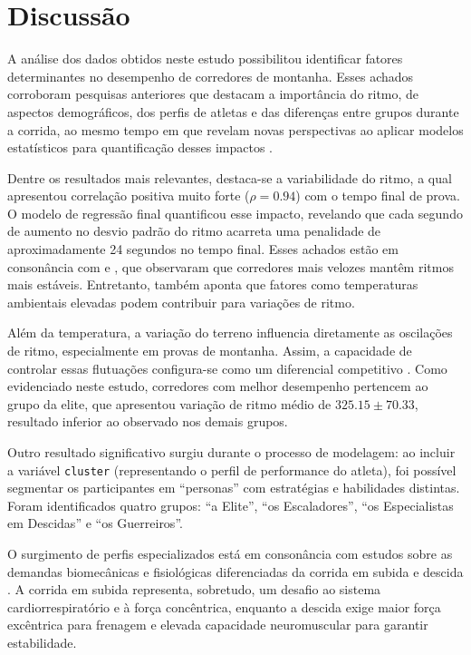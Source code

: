 \chapter{Discussão}
\label{chap:discussao}

A análise dos dados obtidos neste estudo possibilitou identificar fatores determinantes no desempenho de corredores de montanha. Esses achados corroboram pesquisas anteriores que destacam a importância do ritmo, de aspectos demográficos, dos perfis de atletas e das diferenças entre grupos durante a corrida, ao mesmo tempo em que revelam novas perspectivas ao aplicar modelos estatísticos para quantificação desses impactos \cite{borgesdl}.

Dentre os resultados mais relevantes, destaca-se a variabilidade do ritmo, a qual apresentou correlação positiva muito forte ($\rho = 0.94$) com o tempo final de prova. O modelo de regressão final quantificou esse impacto, revelando que cada segundo de aumento no desvio padrão do ritmo acarreta uma penalidade de aproximadamente 24 segundos no tempo final. Esses achados estão em consonância com \cite{Hoffman2014} e \cite{EsteveLanao2014}, que observaram que corredores mais velozes mantêm ritmos mais estáveis. Entretanto, \cite{Hoffman2014} também aponta que fatores como temperaturas ambientais elevadas podem contribuir para variações de ritmo.

Além da temperatura, a variação do terreno influencia diretamente as oscilações de ritmo, especialmente em provas de montanha. Assim, a capacidade de controlar essas flutuações configura-se como um diferencial competitivo \cite{borgesdl}. Como evidenciado neste estudo, corredores com melhor desempenho pertencem ao grupo da elite, que apresentou variação de ritmo médio de $325.15 \pm 70.33$, resultado inferior ao observado nos demais grupos.

Outro resultado significativo surgiu durante o processo de modelagem: ao incluir a variável \texttt{cluster} (representando o perfil de performance do atleta), foi possível segmentar os participantes em “personas” com estratégias e habilidades distintas. Foram identificados quatro grupos: “a Elite”, “os Escaladores”, “os Especialistas em Descidas” e “os Guerreiros”.

O surgimento de perfis especializados está em consonância com estudos sobre as demandas biomecânicas e fisiológicas diferenciadas da corrida em subida e descida \cite{Vernillo2017}. A corrida em subida representa, sobretudo, um desafio ao sistema cardiorrespiratório e à força concêntrica, enquanto a descida exige maior força excêntrica para frenagem e elevada capacidade neuromuscular para garantir estabilidade.

